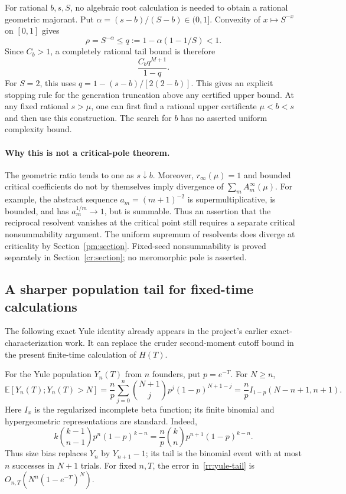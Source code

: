 For rational $b,s,S$, no algebraic root calculation is needed to obtain
a rational geometric majorant. Put $\alpha=(s-b)/(S-b)\in(0,1]$.
Convexity of $x\mapsto S^{-x}$ on $[0,1]$ gives
\[
 \rho=S^{-\alpha}\le q:=1-\alpha(1-1/S)<1.
\]
Since $C_b>1$, a completely rational tail bound is therefore
\[
 \frac{C_bq^{M+1}}{1-q}.
\]
For $S=2$, this uses $q=1-(s-b)/[2(2-b)]$.
This gives an explicit stopping rule for the generation truncation
above any certified upper bound. At any fixed rational $s>\mu$, one
can first find a rational upper certificate $\mu<b<s$ and then use
this construction. The search for $b$ has no asserted uniform
complexity bound.

\paragraph{Why this is not a critical-pole theorem.}
The geometric ratio tends to one as $s\downarrow b$. Moreover,
$r_\infty(\mu)=1$ and bounded critical coefficients do not by
themselves imply divergence of $\sum_m A_m^\infty(\mu)$.
For example, the abstract sequence $a_m=(m+1)^{-2}$ is
supermultiplicative, is bounded, and has $a_m^{1/m}\to1$, but is
summable. Thus an assertion that the reciprocal resolvent vanishes at
the critical point still requires a separate critical nonsummability
argument.
The uniform supremum of resolvents does diverge at criticality by
Section~\ref{pm:section}. Fixed-seed nonsummability is proved separately
in Section~\ref{cr:section}; no meromorphic pole is asserted.

\subsection{A sharper population tail for fixed-time calculations}

The following exact Yule identity already appears in the project's
earlier exact-characterization work. It can replace the cruder
second-moment cutoff bound in the present finite-time calculation of
$H(T)$.

For the Yule population $Y_n(T)$ from $n$ founders, put $p=e^{-T}$.
For $N\ge n$,
\begin{equation}\label{rr:yule-tail}
 \mathbb E[Y_n(T);Y_n(T)>N]
 =\frac np\sum_{j=0}^n\binom{N+1}{j}p^j(1-p)^{N+1-j}
 =\frac np I_{1-p}(N-n+1,n+1).
\end{equation}
Here $I_x$ is the regularized incomplete beta function; its finite
binomial and hypergeometric representations are standard\cite{DLMF}.
Indeed,
\[
 k\binom{k-1}{n-1}p^n(1-p)^{k-n}
 =\frac np\binom{k}{n}p^{n+1}(1-p)^{k-n}.
\]
Thus size bias replaces $Y_n$ by $Y_{n+1}-1$; its tail is the
binomial event with at most $n$ successes in $N+1$ trials. For fixed
$n,T$, the error in~\eqref{rr:yule-tail} is
$O_{n,T}(N^n(1-e^{-T})^N)$.

